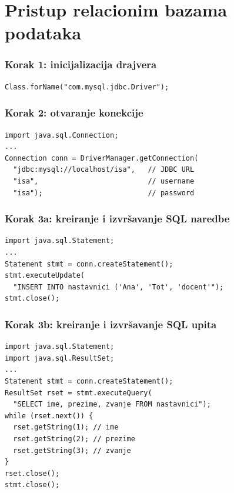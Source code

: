 \documentclass[compress]{beamer}
\begin{document}
\section[JDBC]{Pristup relacionim bazama podataka}
\begin{frame}[fragile]
  \frametitle{Korak 1: inicijalizacija drajvera}
\begin{verbatim}
Class.forName("com.mysql.jdbc.Driver");
\end{verbatim}
\end{frame}
\begin{frame}[fragile]
  \frametitle{Korak 2: otvaranje konekcije}
\begin{verbatim}
import java.sql.Connection;
...
Connection conn = DriverManager.getConnection(
  "jdbc:mysql://localhost/isa",   // JDBC URL
  "isa",                          // username
  "isa");                         // password
\end{verbatim}
\end{frame}
\begin{frame}[fragile]
  \frametitle{Korak 3a: kreiranje i izvršavanje SQL naredbe}
\begin{verbatim}
import java.sql.Statement;
...
Statement stmt = conn.createStatement();
stmt.executeUpdate(
  "INSERT INTO nastavnici ('Ana', 'Tot', 'docent'");
stmt.close();
\end{verbatim}
\end{frame}
\begin{frame}[fragile]
  \frametitle{Korak 3b: kreiranje i izvršavanje SQL upita}
\begin{verbatim}
import java.sql.Statement;
import java.sql.ResultSet;
...
Statement stmt = conn.createStatement();
ResultSet rset = stmt.executeQuery(
  "SELECT ime, prezime, zvanje FROM nastavnici");
while (rset.next()) {
  rset.getString(1); // ime
  rset.getString(2); // prezime
  rset.getString(3); // zvanje
}
rset.close();
stmt.close();
\end{verbatim}
\end{frame}
\end{document}
